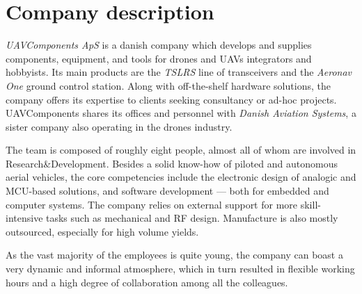 \section{Company description}

\emph{UAVComponents ApS} is a danish company which develops and supplies components, equipment, and tools for drones and UAVs integrators and hobbyists.
Its main products are the \emph{TSLRS} line of transceivers and the \emph{Aeronav One} ground control station.
Along with off-the-shelf hardware solutions, the company offers its expertise to clients seeking consultancy or ad-hoc projects.
UAVComponents shares its offices and personnel with \emph{Danish Aviation Systems}, a sister company also operating in the drones industry.

The team is composed of roughly eight people, almost all of whom are involved in Research\&Development.
Besides a solid know-how of piloted and autonomous aerial vehicles, the core competencies include the electronic design of analogic and MCU-based solutions, and software development --- both for embedded and computer systems.
The company relies on external support for more skill-intensive tasks such as mechanical and RF design.
Manufacture is also mostly outsourced, especially for high volume yields.

As the vast majority of the employees is quite young, the company can boast a very dynamic and informal atmosphere, which in turn resulted in flexible working hours and a high degree of collaboration among all the colleagues.
